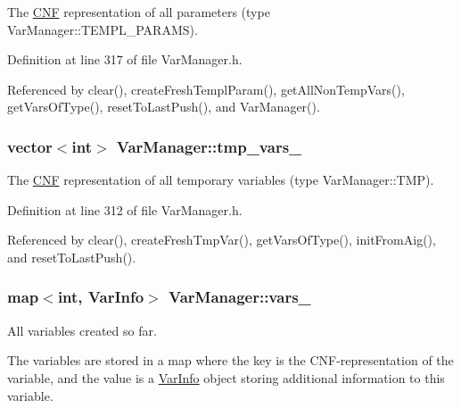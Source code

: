 The \hyperlink{classCNF}{C\-N\-F} representation of all parameters (type Var\-Manager\-::\-T\-E\-M\-P\-L\-\_\-\-P\-A\-R\-A\-M\-S). 



Definition at line 317 of file Var\-Manager.\-h.



Referenced by clear(), create\-Fresh\-Templ\-Param(), get\-All\-Non\-Temp\-Vars(), get\-Vars\-Of\-Type(), reset\-To\-Last\-Push(), and Var\-Manager().

\hypertarget{classVarManager_aa22f9522aa27237a2dee30503c20e45f}{
\subsubsection[{tmp\-\_\-vars\-\_\-}]{\setlength{\rightskip}{0pt plus 5cm}vector$<$int$>$ Var\-Manager\-::tmp\-\_\-vars\-\_\-\hspace{0.3cm}{\ttfamily [protected]}}}\label{classVarManager_aa22f9522aa27237a2dee30503c20e45f}


The \hyperlink{classCNF}{C\-N\-F} representation of all temporary variables (type Var\-Manager\-::\-T\-M\-P). 



Definition at line 312 of file Var\-Manager.\-h.



Referenced by clear(), create\-Fresh\-Tmp\-Var(), get\-Vars\-Of\-Type(), init\-From\-Aig(), and reset\-To\-Last\-Push().

\hypertarget{classVarManager_a22299c4735b0191e0f81048882692a45}{
\subsubsection[{vars\-\_\-}]{\setlength{\rightskip}{0pt plus 5cm}map$<$int, {\bf Var\-Info}$>$ Var\-Manager\-::vars\-\_\-\hspace{0.3cm}{\ttfamily [protected]}}}\label{classVarManager_a22299c4735b0191e0f81048882692a45}


All variables created so far. 

The variables are stored in a map where the key is the C\-N\-F-\/representation of the variable, and the value is a \hyperlink{classVarInfo}{Var\-Info} object storing additional information to this variable. 

